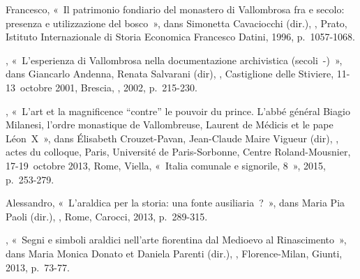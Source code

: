 \begin{teiElement}[name={TEI},change={commons\_edition}]
\begin{teiElement}[name={text},type={book},xmlid={book}]
\begin{teiElement}[name={group},type={book},xmlid={book-001}]
\begin{teiElement}[name={group},type={bibliography},data-page-title={Sources et bibliographie},data-include-href={Ch14\_Source\_bibliographie.xml},xmlid={bibliography-001}]
\begin{teiElement}[name={body}]
\begin{teiDiv}[type={section1},xmlid={div18}]
\begin{teiDiv}[type={section2},xmlid={div19}]
\begin{teiBibl}[xmlid={bibl-413}]
 Francesco, « Il patrimonio fondiario del monastero di Vallombrosa fra  e  secolo: presenza e utilizzazione del bosco », dans Simonetta Cavaciocchi (dir.), , Prato, Istituto Internazionale di Storia Economica Francesco Datini, 1996, p. 1057-1068.
\end{teiBibl}
              \begin{teiBibl}[xmlid={bibl-414}]
, « L’esperienza di Vallombrosa nella documentazione archivistica (secoli -) », dans Giancarlo Andenna, Renata Salvarani (dir), , Castiglione delle Stiviere, 11-13 octobre 2001, Brescia, , 2002, p. 215-230.
\end{teiBibl}
              \begin{teiBibl}[xmlid={bibl-415}]
, « L’art et la magnificence “contre” le pouvoir du prince. L’abbé général Biagio Milanesi, l’ordre monastique de Vallombreuse, Laurent de Médicis et le pape Léon X », dans Élisabeth Crouzet-Pavan, Jean-Claude Maire Vigueur (dir), , actes du colloque, Paris, Université de Paris-Sorbonne, Centre Roland-Mousnier, 17-19 octobre 2013, Rome, Viella, « Italia comunale e signorile, 8 », 2015, p. 253-279.
\end{teiBibl}
              \begin{teiBibl}[xmlid={bibl-416}]
 Alessandro, « L’araldica per la storia: una fonte ausiliaria ? », dans Maria Pia Paoli (dir.), , Rome, Carocci, 2013, p. 289-315.
\end{teiBibl}
              \begin{teiBibl}[xmlid={bibl-417}]
, « Segni e simboli araldici nell’arte fiorentina dal Medioevo al Rinascimento », dans Maria Monica Donato et Daniela Parenti (dir.), , Florence-Milan, Giunti, 2013, p. 73-77.
\end{teiBibl}
              \begin{teiBibl}[xmlid={bibl-418}]

\end{teiBibl}
\end{teiDiv}
\end{teiDiv}
\end{teiElement}
\end{teiElement}
\end{teiElement}
\end{teiElement}
\end{teiElement}
